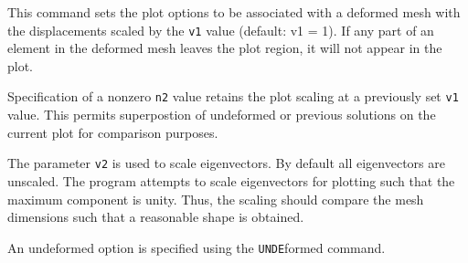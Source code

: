 \headb

This command sets the plot options to be associated
with a deformed mesh with the displacements scaled by the
\texttt{v1} value (default: v1 = 1). If any part of an element in
the deformed mesh leaves the plot region, it will not
appear in the plot.

Specification of a nonzero \texttt{n2} value retains the plot
scaling at a previously set \texttt{v1} value.  This permits superpostion
of undeformed or previous solutions on the current
plot for comparison purposes.

The parameter \texttt{v2} is used to scale eigenvectors.  By default all
eigenvectors are unscaled.  The program attempts to scale eigenvectors for 
plotting such that the maximum component is unity.  Thus, the scaling should
compare the mesh dimensions such that a reasonable shape is obtained.

An undeformed option is specified using the \texttt{UNDE}formed command.
\vfill
\eject
